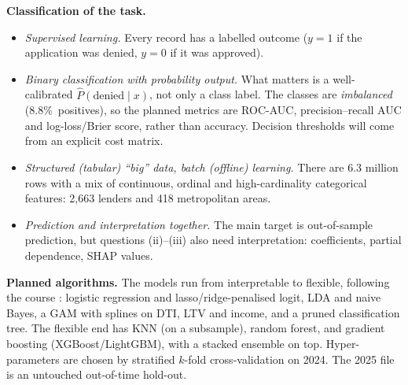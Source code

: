 \documentclass[11pt,a4paper]{article}
\newcommand{\pct}{\%}
\begin{document}
\textbf{Classification of the task.}
\begin{itemize}
  \item \emph{Supervised learning.} Every record has a labelled outcome
  ($y=1$ if the application was denied, $y=0$ if it was approved).
  \item \emph{Binary classification with probability output.} What matters is a
  well-calibrated $\hat{P}(\text{denied}\mid x)$, not only a class label. The classes
  are \emph{imbalanced} (8.8\pct\ positives), so the planned metrics are ROC-AUC,
  precision--recall AUC and log-loss/Brier score, rather than accuracy. Decision
  thresholds will come from an explicit cost matrix.
  \item \emph{Structured (tabular) ``big'' data, batch (offline) learning.} There are
  6.3 million rows with a mix of continuous, ordinal and high-cardinality categorical
  features: 2{,}663 lenders and 418 metropolitan areas.
  \item \emph{Prediction and interpretation together.} The main target is out-of-sample
  prediction, but questions (ii)--(iii) also need interpretation: coefficients, partial
  dependence, SHAP values.
\end{itemize}

\textbf{Planned algorithms.} The models run from interpretable to flexible, following
the course \cite{islp}: logistic regression and lasso/ridge-penalised logit, LDA and naive Bayes,
a GAM with splines on DTI, LTV and income, and a pruned classification tree. The
flexible end has KNN (on a subsample), random forest, and gradient boosting
(XGBoost/LightGBM), with a stacked ensemble on top. Hyper-parameters are chosen by
stratified $k$-fold cross-validation on 2024. The 2025 file is an untouched
out-of-time hold-out.
\end{document}
